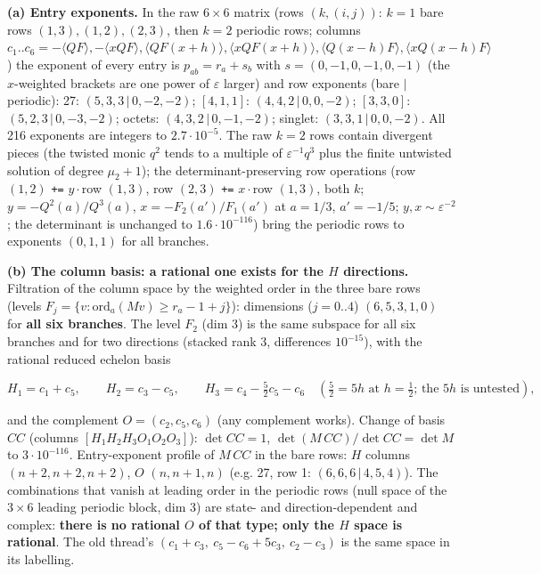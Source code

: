 \documentclass[10pt]{article}
\newcommand{\nb}[1]{\texttt{#1}}
\begin{document}
\textbf{(a) Entry exponents.} In the raw $6\times6$ matrix (rows $(k,(i,j))$: $k=1$ bare rows $(1,3),(1,2),(2,3)$, then $k=2$ periodic rows; columns $c_1..c_6=-\langle QF\rangle,-\langle xQF\rangle,\langle QF(x{+}h)\rangle,\langle xQF(x{+}h)\rangle,\langle Q(x{-}h)F\rangle,\langle xQ(x{-}h)F\rangle$) the exponent of every entry is $p_{ab}=r_a+s_b$ with $s=(0,-1,0,-1,0,-1)$ (the $x$-weighted brackets are one power of $\varepsilon$ larger) and row exponents (bare $|$ periodic): 27: $(5,3,3\,|\,0,-2,-2)$; $[4,1,1]$: $(4,4,2\,|\,0,0,-2)$; $[3,3,0]$: $(5,2,3\,|\,0,-3,-2)$; octets: $(4,3,2\,|\,0,-1,-2)$; singlet: $(3,3,1\,|\,0,0,-2)$. All 216 exponents are integers to $2.7\cdot10^{-5}$. The raw $k=2$ rows contain divergent pieces (the twisted monic $q^2$ tends to a multiple of $\varepsilon^{-1}q^3$ plus the finite untwisted solution of degree $\mu_2+1$); the determinant-preserving row operations (row $(1,2)$ \nb{+=} $y\cdot$row $(1,3)$, row $(2,3)$ \nb{+=} $x\cdot$row $(1,3)$, both $k$; $y=-Q^2(a)/Q^3(a)$, $x=-F_2(a')/F_1(a')$ at $a=1/3$, $a'=-1/5$; $y,x\sim\varepsilon^{-2}$; the determinant is unchanged to $1.6\cdot10^{-116}$) bring the periodic rows to exponents $(0,1,1)$ for all branches.

\textbf{(b) The column basis: a rational one exists for the $H$ directions.} Filtration of the column space by the weighted order in the three bare rows (levels $F_j=\{v:\mathrm{ord}_a(Mv)\ge r_a-1+j\}$): dimensions ($j=0..4$) $(6,5,3,1,0)$ for \textbf{all six branches}. The level $F_2$ (dim 3) is the same subspace for all six branches and for two directions (stacked rank 3, differences $10^{-15}$), with the rational reduced echelon basis

\[
H_1=c_1+c_5,\qquad H_2=c_3-c_5,\qquad H_3=c_4-\tfrac52c_5-c_6\quad(\tfrac52=5h\text{ at }h=\tfrac12\text{; the }5h\text{ is untested}),
\]

and the complement $O=(c_2,c_5,c_6)$ (any complement works). Change of basis $CC$ (columns $[H_1H_2H_3O_1O_2O_3]$): $\det CC=1$, $\det(M\,CC)/\det CC=\det M$ to $3\cdot10^{-116}$. Entry-exponent profile of $M\,CC$ in the bare rows: $H$ columns $(n+2,n+2,n+2)$, $O$ $(n,n+1,n)$ (e.g. 27, row 1: $(6,6,6\,|\,4,5,4)$). The combinations that vanish at leading order in the periodic rows (null space of the $3\times6$ leading periodic block, dim 3) are state- and direction-dependent and complex: \textbf{there is no rational $O$ of that type; only the $H$ space is rational}. The old thread's $(c_1{+}c_3,\ c_5{-}c_6{+}5c_3,\ c_2{-}c_3)$ is the same space in its labelling.
\end{document}
